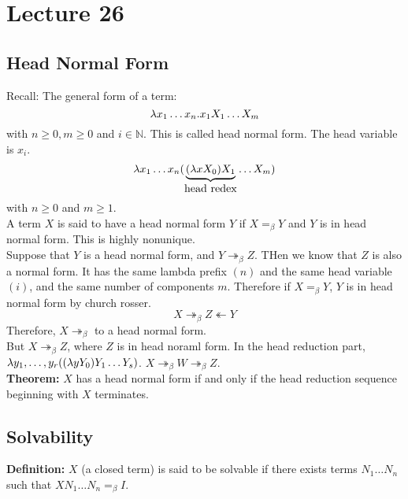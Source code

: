 \chapter{Lecture 26}
\pagestyle{fancy}

\section{Head Normal Form}
Recall: The general form of a term:
\begin{equation*}
  \lambda x_1\ldots x_n.x_1X_1\ldots X_m
\end{equation*}
with $n \geq 0, m \geq 0$ and $i \in \mathbb{N}$. This is called head normal form. The head variable is $x_i$.
\begin{equation*}
  \lambda x_1\ldots x_n(\underbrace{(\lambda x X_0)X_1}_{\hbox{head redex}}\ldots X_m)
\end{equation*}
with $n \geq 0$ and $m \geq 1$.\\

A term $X$ is said to have a head normal form $Y$ if $X =_\beta Y$ and $Y$ is in head normal form. This is highly nonunique.\\

Suppose that $Y$ is a head normal form, and $Y \twoheadrightarrow_\beta Z$. THen we know that $Z$ is also a normal form. It has the same lambda prefix $(n)$ and the same head variable $(i)$, and the same number of components $m$. Therefore if $X =_\beta Y$, $Y$ is in head normal form by church rosser.
\begin{equation*}
  X \twoheadrightarrow_\beta Z \twoheadleftarrow Y
\end{equation*}
Therefore, $X \twoheadrightarrow_\beta$ to a head normal form.\\

But $X \twoheadrightarrow_\beta Z$, where $Z$ is in head noraml form. In the head reduction part, $\lambda y_1,\ldots,y_r((\lambda yY_0)Y_1\ldots Y_s)$. $X \twoheadrightarrow_\beta W \twoheadrightarrow_\beta Z$.\\

\textbf{Theorem:} $X$ has a head normal form if and only if the head reduction sequence beginning with $X$ terminates.\\

\section{Solvability}
\textbf{Definition:} $X$ (a closed term) is said to be solvable if there exists terms $N_1\ldots N_n$ such that $XN_1\ldots N_n =_\beta I$.

